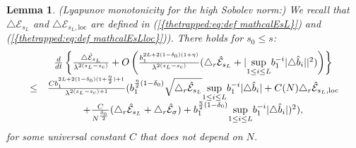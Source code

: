 \documentclass[11pt,a4paper,reqno]{amsart}
\newtheorem{lemma}[theorem]{Lemma}
\theoremstyle{remark}
\numberwithin{equation}{section}
\begin{document}
\begin{lemma}\label{variete:lem:high sobo}
\emph{(Lyapunov monotonicity for the high Sobolev norm:)} We recall that $\triangle \mathcal{E}_{s_L}$ and $\triangle \mathcal{E}_{s_L,\text{loc}}$ are defined in {{\rm (\ref{{thetrapped:eq:def mathcalEsL}})}} and {{\rm (\ref{{thetrapped:eq:def mathcalEsLloc}})}}). There holds for $s_0\leq s$:
\begin{equation} \label{variete:eq:high sobo}
\begin{array}{r c l}
&\frac{d}{dt}\left\{ \frac{\triangle \hat{\mathcal{E}}_{s_L}}{\lambda^{2(s_L-s_c)}}+O \left( \frac{b_1^{2L+2(1-\delta_0)(1+\eta)}}{\lambda^{2(s_L-s_c)}}(\triangle_r \hat{\mathcal{E}}_{s_L}+|\underset{1\leq i \leq L}{\text{sup}}b_1^{-i}|\triangle \hat{b}_i||^2) \right) \right\} \\
\leq& \frac{Cb_1^{2L+2(1-\delta_0)(1+\frac{\eta}{2})+1}}{\lambda^{2(s_L-s_c)+1}}(b_1^{\frac{\eta}{2}(1-\delta_0)}\sqrt{\triangle_r \hat{\mathcal{E}}_{s_L}}\underset{1\leq i \leq L}{\text{sup}}b_1^{-i}|\triangle \hat{b}_i|+C(N)\triangle_r \hat{\mathcal{E}}_{s_L,\text{loc}} \\
&+\frac{C}{N^{\frac{\delta_0}{2}}}(\triangle_r \hat{\mathcal{E}}_{s_L}+\triangle_r \hat{\mathcal{E}}_{\sigma})+b_1^{\frac{\eta}{2}(1-\delta_0)}\underset{1\leq i \leq L}{\text{sup}}b_1^{-i}|\triangle \hat{b}_i|)^2) ,\\
\end{array}
\end{equation}
for some universal constant $C$ that does not depend on $N$.
\end{lemma}
\end{document}
